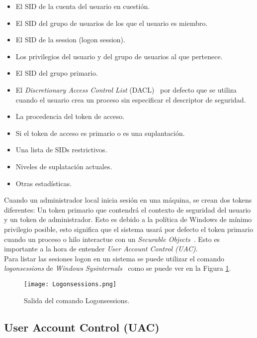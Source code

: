 \begin{itemize}
\item El SID de la cuenta del usuario en cuestión.
\item El SID del grupo de usuarios de los que el usuario es miembro.
\item El SID de la session (logon session).
\item Los privilegios del usuario y del grupo de usuarios al que pertenece.
\item El SID del grupo primario. 
\item El {\it Discretionary Access Control List} (DACL)~\cite{Capitulo2:DACL} por defecto que se utiliza cuando el usuario crea un proceso sin especificar el descriptor de seguridad.
\item La procedencia del token de acceso.
\item Si el token de acceso es primario o es una suplantación. 
\item Una lista de SIDs restrictivos.
\item Niveles de suplatación actuales.
\item Otras estadísticas. 
\end{itemize}

Cuando un administrador local inicia sesión en una máquina, se crean dos tokens diferentes: Un token primario que contendrá el contexto de seguridad del usuario y un token de administrador. Esto es debido a la política de Windows de mínimo privilegio posible, esto significa que el sistema usará por defecto el token primario cuando un proceso o hilo interactue con un {\it Securable Objects}~\cite{Capitulo2:Securable-Objects}. Esto es importante a la hora de entender {\it User Account Control (UAC)}.\\

Para listar las sesiones logon en un sistema se puede utilizar el comando {\it logonsessions} de {\it Windows Sysinternals}~\cite{Capitulo2:Sysinternals} como se puede ver en la Figura \ref{Logonsessions}.

\begin{figure}[t!] %
\begin{center}
\texttt{[image: Logonsessions.png]}
\end{center}
\caption{Salida del comando Logonsessions.}
\label{Logonsessions}
\end{figure}

\subsection{User Account Control (UAC)}

